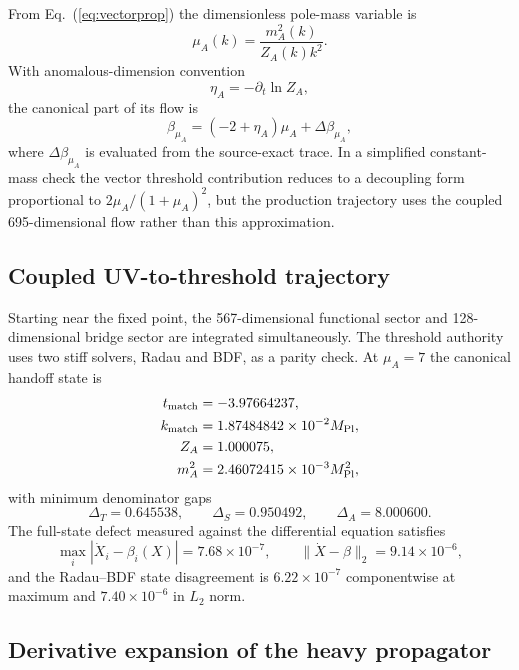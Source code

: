 \documentclass[12pt]{iopart}
\newcommand{\mpl}{M_{\rm Pl}}
\begin{document}
From Eq.~(\ref{eq:vectorprop}) the dimensionless pole-mass variable is
\begin{equation}
\mu_A(k)=\frac{m_A^2(k)}{Z_A(k)k^2}.
\label{eq:mu}
\end{equation}
With anomalous-dimension convention
\begin{equation}
\eta_A=-\partial_t\ln Z_A,
\end{equation}
the canonical part of its flow is
\begin{equation}
\beta_{\mu_A}=(-2+\eta_A)\mu_A+\Delta\beta_{\mu_A},
\label{eq:betamu}
\end{equation}
where $\Delta\beta_{\mu_A}$ is evaluated from the source-exact trace.  In a simplified constant-mass check the vector threshold contribution reduces to a decoupling form proportional to $2\mu_A/(1+\mu_A)^2$, but the production trajectory uses the coupled 695-dimensional flow rather than this approximation.

\subsection{Coupled UV-to-threshold trajectory}

Starting near the fixed point, the 567-dimensional functional sector and 128-dimensional bridge sector are integrated simultaneously.  The threshold authority uses two stiff solvers, Radau and BDF, as a parity check.  At $\mu_A=7$ the canonical handoff state is
\begin{align}
 t_{\rm match}&=-3.97664237,\\
 k_{\rm match}&=1.87484842\times10^{-2}\mpl,\\
 Z_A&=1.000075,\\
 m_A^2&=2.46072415\times10^{-3}\mpl^2,
\end{align}
with minimum denominator gaps
\begin{equation}
\Delta_T=0.645538,\qquad \Delta_S=0.950492,\qquad \Delta_A=8.000600.
\end{equation}
The full-state defect measured against the differential equation satisfies
\begin{equation}
\max_i|\dot X_i-\beta_i(X)|=7.68\times10^{-7},\qquad
\|\dot X-\beta\|_2=9.14\times10^{-6},
\end{equation}
and the Radau--BDF state disagreement is $6.22\times10^{-7}$ componentwise at maximum and $7.40\times10^{-6}$ in $L_2$ norm.

\subsection{Derivative expansion of the heavy propagator}
\end{document}

